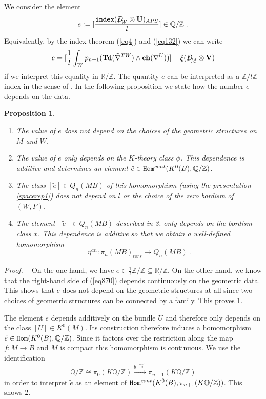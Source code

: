 \documentclass[12pt]{article}
\newtheorem{prop}[theorem]{Proposition}
\newcommand{\proof}{{\it Proof.$\:\:\:\:$}}
\newcommand{\Z}{{\mathbb{Z}}}
\newcommand{\Q}{{\mathbb{Q}}}
\newcommand{\R}{{\mathbb{R}}}
\newcommand{\Hom}{{\tt Hom}}
\newcommand{\Td}{{\mathbf{Td}}}
\newcommand{\ch}{{\mathbf{ch}}}
\newcommand{\bV}{{\mathbf{V}}}
\newcommand{\bU}{{\mathbf{U}}}
\newcommand{\Dirac}{{D\hspace{-0.27cm}/}}
\newcommand{\ind}{{\tt index}}
\begin{document}
We consider the element
\begin{equation}\label{eq870v}e:=[\frac{\ind(\Dirac_{W}\otimes \bU)_{APS}}{l}]\in \Q/\Z\ .\end{equation}
Equivalently, by the index theorem  (\ref{eq4}) and (\ref{eq132}) we can write
\begin{equation}\label{eq870}e=[\frac{1}{l}\int_{W} p_{n+1}(\Td(\tilde \nabla^{TW})\wedge \ch(\nabla^{U}))]-\xi(\Dirac_{M}\otimes \bV)\end{equation} 
if we interpret this equality in $\R/\Z$.  
The quantity $e$ can be interpreted as a $\Z/l\Z$-index in the sense of \cite{MR1144425}.
In the following proposition we state how the number $e$ depends on the data.
\begin{prop}
\begin{enumerate}
\item
The value of $e$ does not depend on the choices of the geometric structures on $M$ and $W$.
\item The value of  $e$ only  depends on the $K$-theory class $\phi$. This dependence is additive and determines an element  
$\tilde e\in \Hom^{cont}(K^{0}(B),\Q/\Z)$.
\item The class $[\tilde e]\in Q_{n}(MB)$ of this homomorphism (using the presentation \eqref{spacerep1}) does not depend on $l$ or the choice of the zero bordism of $(W,F)$.
\item The element  $[\tilde e]\in Q_{n}(MB)$ described in 3. only depends on the bordism class $x$. This dependence is additive so that we obtain a well-defined homomorphism
$$\eta^{an}:\pi_{n}(MB)_{tors}\to Q_{n}(MB)\ .$$ 
\end{enumerate}
\end{prop}
\proof
On the one hand, we have $e\in \frac{1}{l}\Z/\Z\subseteq \R/\Z$. On the other hand, we know that
the right-hand side of (\ref{eq870}) depends continuously on the geometric data.
This shows that $e$ does not depend on the geometric structures at all since two choices  of  geometric structures can be connected by a family. This proves 1.

 
The element $e$ depends additively on the bundle $U$ and therefore only depends on the class $[U]\in K^{0}(M)$. Its construction  therefore  induces a  homomorphism
$\tilde e\in \Hom(K^{0}(B ),  \Q/\Z)$. 
Since it factors over the restriction along the map $f:M\to B$ and $M$ is compact this homomorphism is continuous. We use the identification 
$$\Q/\Z\cong \pi_{0}(K\Q/\Z)\xrightarrow{b^{-\frac{n+1}{2}}} \pi_{n+1}(K\Q/\Z)$$
in order to interpret $\tilde e$ as an element of 
$  \Hom^{cont}(K^{0}(B ),  \pi_{n+1}(K\Q/\Z))$.
This shows 2.
\end{document}
